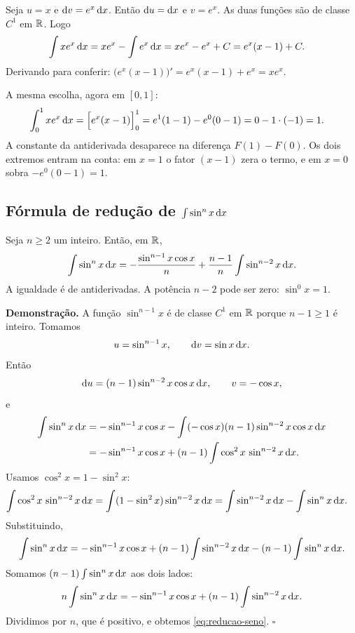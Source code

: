 \documentclass[11pt,a4paper]{article}
\begin{document}
\begin{exemplo}[A antiderivada de \(x e^{x}\)]
Seja \(u=x\) e \(\mathrm{d} v=e^{x}\,\mathrm{d} x\). Então \(\mathrm{d} u=\mathrm{d} x\) e \(v=e^{x}\). As duas funções são de classe \(C^1\) em \(\mathbb{R}\). Logo
\begin{align*}
\int x e^{x}\,\mathrm{d} x
&=x e^{x}-\int e^{x}\,\mathrm{d} x
=x e^{x}-e^{x}+C
=e^{x}(x-1)+C.
\end{align*}
Derivando para conferir: \(\bigl(e^{x}(x-1)\bigr)'=e^{x}(x-1)+e^{x}=x e^{x}\).
\end{exemplo}

\begin{exemplo}
A mesma escolha, agora em \([0,1]\):
\begin{align*}
\int_0^1 x e^{x}\,\mathrm{d} x
&=\Bigl[e^{x}(x-1)\Bigr]_0^1
=e^{1}(1-1)-e^{0}(0-1)
=0-1\cdot(-1)
=1.
\end{align*}
A constante da antiderivada desaparece na diferença \(F(1)-F(0)\). Os dois extremos entram na conta: em \(x=1\) o fator \((x-1)\) zera o termo, e em \(x=0\) sobra \(-e^{0}(0-1)=1\).
\end{exemplo}

\subsection{Fórmula de redução de \(\int\sin^{n}x\,\mathrm{d} x\)}

\begin{teorema}
Seja \(n\ge 2\) um inteiro. Então, em \(\mathbb{R}\),
\begin{equation}
\int\sin^{n}x\,\mathrm{d} x
=-\frac{\sin^{n-1}x\cos x}{n}+\frac{n-1}{n}\int\sin^{n-2}x\,\mathrm{d} x.
\label{eq:reducao-seno}
\end{equation}
A igualdade é de antiderivadas. A potência \(n-2\) pode ser zero: \(\sin^{0}x=1\).
\end{teorema}

\noindent\textbf{Demonstração.}
A função \(\sin^{n-1}x\) é de classe \(C^1\) em \(\mathbb{R}\) porque \(n-1\ge 1\) é inteiro. Tomamos
\[
u=\sin^{n-1}x,\qquad \mathrm{d} v=\sin x\,\mathrm{d} x.
\]
Então
\[
\mathrm{d} u=(n-1)\sin^{n-2}x\cos x\,\mathrm{d} x,\qquad v=-\cos x,
\]
e
\begin{align*}
\int\sin^{n}x\,\mathrm{d} x
&=-\sin^{n-1}x\cos x-\int(-\cos x)(n-1)\sin^{n-2}x\cos x\,\mathrm{d} x\\
&=-\sin^{n-1}x\cos x+(n-1)\int\cos^{2}x\,\sin^{n-2}x\,\mathrm{d} x.
\end{align*}
Usamos \(\cos^{2}x=1-\sin^{2}x\):
\begin{align*}
\int\cos^{2}x\,\sin^{n-2}x\,\mathrm{d} x
&=\int(1-\sin^{2}x)\sin^{n-2}x\,\mathrm{d} x
=\int\sin^{n-2}x\,\mathrm{d} x-\int\sin^{n}x\,\mathrm{d} x.
\end{align*}
Substituindo,
\[
\int\sin^{n}x\,\mathrm{d} x
=-\sin^{n-1}x\cos x+(n-1)\int\sin^{n-2}x\,\mathrm{d} x-(n-1)\int\sin^{n}x\,\mathrm{d} x.
\]
Somamos \((n-1)\int\sin^{n}x\,\mathrm{d} x\) aos dois lados:
\[
n\int\sin^{n}x\,\mathrm{d} x
=-\sin^{n-1}x\cos x+(n-1)\int\sin^{n-2}x\,\mathrm{d} x.
\]
Dividimos por \(n\), que é positivo, e obtemos \eqref{eq:reducao-seno}.
\hfill\(\square\)
\end{document}
